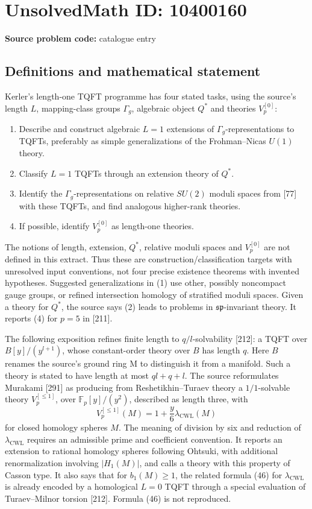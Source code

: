 \documentclass[11pt]{article}
\newcommand{\F}{\mathbb{F}}
\begin{document}
\section*{UnsolvedMath ID: 10400160}
\textbf{Source problem code:} catalogue entry
\subsection{Definitions and mathematical statement}
Kerler's length-one TQFT programme has four stated tasks, using the source's length \(L\), mapping-class groups \(\Gamma_g\), algebraic object \(Q^*\) and theories \(V_p^{[0]}\):
\begin{enumerate}
\item Describe and construct algebraic \(L=1\) extensions of \(\Gamma_g\)-representations to TQFTs, preferably as simple generalizations of the Frohman--Nicas \(U(1)\) theory.
\item Classify \(L=1\) TQFTs through an extension theory of \(Q^*\).
\item Identify the \(\Gamma_g\)-representations on relative \(SU(2)\) moduli spaces from [77] with these TQFTs, and find analogous higher-rank theories.
\item If possible, identify \(V_p^{[0]}\) as length-one theories.
\end{enumerate}
The notions of length, extension, \(Q^*\), relative moduli spaces and \(V_p^{[0]}\) are not defined in this extract. Thus these are construction/classification targets with unresolved input conventions, not four precise existence theorems with invented hypotheses. Suggested generalizations in (1) use other, possibly noncompact gauge groups, or refined intersection homology of stratified moduli spaces. Given a theory for \(Q^*\), the source says (2) leads to problems in \(\mathfrak{sp}\)-invariant theory. It reports (4) for \(p=5\) in [211].

The following exposition refines finite length to \(q/l\)-solvability [212]: a TQFT over \(B[y]/(y^{l+1})\), whose constant-order theory over \(B\) has length \(q\). Here \(B\) renames the source's ground ring \(\mathrm M\) to distinguish it from a manifold. Such a theory is stated to have length at most \(ql+q+l\). The source reformulates Murakami [291] as producing from Reshetikhin--Turaev theory a \(1/1\)-solvable theory \(V_p^{[\leq1]}\), over \(\F_p[y]/(y^2)\), described as length three, with
\[V_p^{[\leq1]}(M)=1+\frac{y}{6}\lambda_{\mathrm{CWL}}(M)\tag{47}\]
for closed homology spheres \(M\). The meaning of division by six and reduction of \(\lambda_{\mathrm{CWL}}\) requires an admissible prime and coefficient convention. It reports an extension to rational homology spheres following Ohtsuki, with additional renormalization involving \(|H_1(M)|\), and calls a theory with this property of Casson type. It also says that for \(b_1(M)\geq1\), the related formula (46) for \(\lambda_{\mathrm{CWL}}\) is already encoded by a homological \(L=0\) TQFT through a special evaluation of Turaev--Milnor torsion [212]. Formula (46) is not reproduced.
\end{document}
